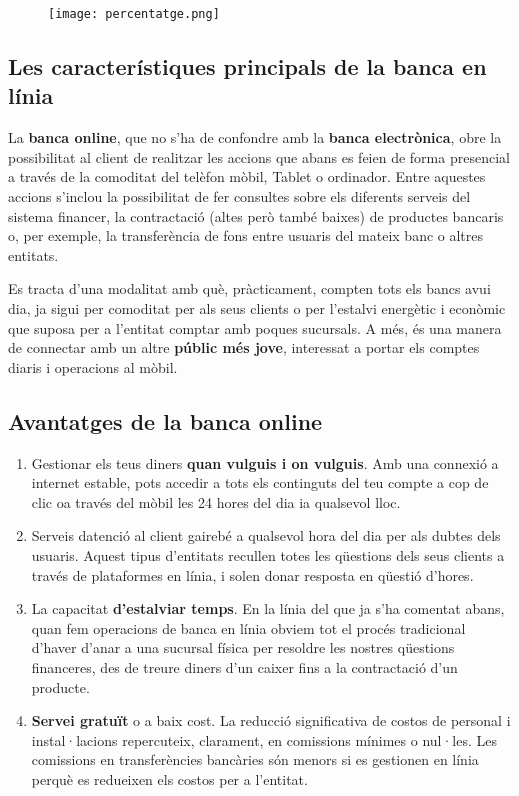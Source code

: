 \begin{figure}[h]
    \centering
    \texttt{[image: percentatge.png]}
\end{figure}
  


\subsection*{Les característiques principals de la banca en línia}

La \textbf{banca online}, que no s'ha de confondre amb la \textbf{banca electrònica}, obre la possibilitat al client de realitzar les accions que abans es feien de forma presencial a través de la comoditat del telèfon mòbil, Tablet o ordinador. Entre aquestes accions s'inclou la possibilitat de fer consultes sobre els diferents serveis del sistema financer, la contractació (altes però també baixes) de productes bancaris o, per exemple, la transferència de fons entre usuaris del mateix banc o altres entitats.

Es tracta d'una modalitat amb què, pràcticament, compten tots els bancs avui dia, ja sigui per comoditat per als seus clients o per l'estalvi energètic i econòmic que suposa per a l'entitat comptar amb poques sucursals. A més, és una manera de connectar amb un altre \textbf{públic més jove}, interessat a portar els comptes diaris i operacions al mòbil.


\subsection*{Avantatges de la banca online}


\begin{enumerate}
    \item Gestionar els teus diners \textbf{quan vulguis i on vulguis}. Amb una connexió a internet estable, pots accedir a tots els continguts del teu compte a cop de clic oa través del mòbil les 24 hores del dia ia qualsevol lloc.
    \item Serveis datenció al client gairebé a qualsevol hora del dia per als dubtes dels usuaris. Aquest tipus d'entitats recullen totes les qüestions dels seus clients a través de plataformes en línia, i solen donar resposta en qüestió d'hores.
    \item La capacitat \textbf{d'estalviar temps}. En la línia del que ja s'ha comentat abans, quan fem operacions de banca en línia obviem tot el procés tradicional d'haver d'anar a una sucursal física per resoldre les nostres qüestions financeres, des de treure diners d'un caixer fins a la contractació d'un producte.
    \item \textbf{Servei gratuït} o a baix cost. La reducció significativa de costos de personal i instal·lacions repercuteix, clarament, en comissions mínimes o nul·les. Les comissions en transferències bancàries són menors si es gestionen en línia perquè es redueixen els costos per a l'entitat.
\end{enumerate}




